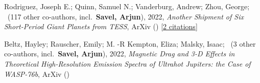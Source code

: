 \item[{\color{numcolor}\scriptsize2}] Rodriguez, Joseph E.; Quinn, Samuel N.; Vanderburg, Andrew; Zhou, George; \etal\ ({117} other co-authors, incl.\ \textbf{Savel, Arjun}), 2022, \emph{Another Shipment of Six Short-Period Giant Planets from TESS}, ArXiv () [\href{https://ui.adsabs.harvard.edu/abs/2022arXiv220505709R}{2 citations}]

\item[{\color{numcolor}\scriptsize1}] Beltz, Hayley; Rauscher, Emily; M. -R Kempton, Eliza; Malsky, Isaac; \etal\ ({3} other co-authors, incl.\ \textbf{Savel, Arjun}), 2022, \emph{Magnetic Drag and 3-D Effects in Theoretical High-Resolution Emission Spectra of Ultrahot Jupiters: the Case of WASP-76b}, ArXiv ()
